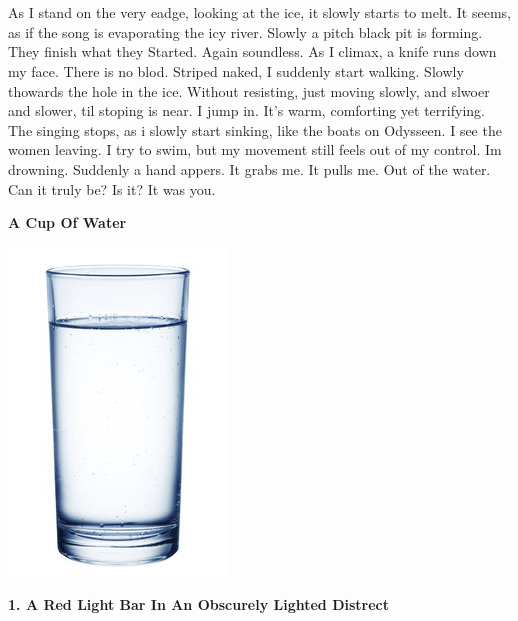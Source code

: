\documentclass[]{article}
\begin{document}
\\ \\
As I stand on the very eadge, looking at the ice, it slowly starts to melt. It seems, as if the song is evaporating the icy river. Slowly a pitch black pit is forming. They finish what they Started. Again soundless. As I climax, a knife runs down my face. There is no blod. Striped naked, I suddenly start walking. Slowly thowards the hole in the ice. Without resisting, just moving slowly, and slwoer and slower, til stoping is near. I jump in. It's warm, comforting yet terrifying. The singing stops, as i slowly start sinking, like the boats on Odysseen. I see the women leaving. I try to swim, but my movement still feels out of my control. Im drowning. Suddenly a hand appers. It grabs me. It pulls me. Out of the water. Can it truly be? Is it? It was you.

\newpage

\begin{center}
	\Large\textbf{A Cup Of Water}
\end{center}

\begin{center}
	\includegraphics{water4}
\end{center}


\begin{center}
	\large\textbf{1. A Red Light Bar In An \newline Obscurely Lighted Distrect}
\end{center}
\end{document}
